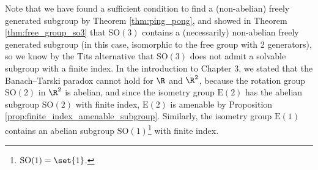 Note that we have found a sufficient condition to find a (non-abelian) freely generated subgroup by Theorem \ref{thm:ping_pong}, and showed in Theorem \ref{thm:free_group_so3} that $\text{SO}(3)$ contains a (necessarily) non-abelian freely generated subgroup (in this case, isomorphic to the free group with 2 generators), so we know by the Tits alternative that $\text{SO}(3)$ does not admit a solvable subgroup with a finite index. In the introduction to Chapter 3, we stated that the Banach--Tarski paradox cannot hold for $\R$ and $\R^2$, because the rotation group $\text{SO}\left(2\right)$ in $\R^2$ is abelian, and since the isometry group $\text{E}\left(2\right)$ has the abelian subgroup $\text{SO}\left(2\right)$ with finite index, $\text{E}\left(2\right)$ is amenable by Proposition \ref{prop:finite_index_amenable_subgroup}. Similarly, the isometry group $\text{E}(1)$ contains an abelian subgroup $\text{SO}(1)$\footnote{$\text{SO}(1) = \set{1}$.} with finite index.
